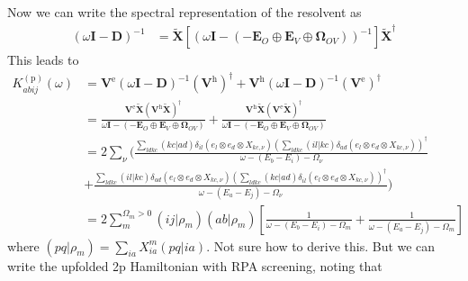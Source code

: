Now we can write the spectral representation of the resolvent as
\begin{align}
(\omega \mathbf{I} - \bm{D})^{-1} &= \bm{\tilde{X}} \left[\left(\omega \mathbf{I} - \left(-\bm{E}_O \oplus \bm{E}_V \oplus \bm{\Omega }_{OV}\right)\right)^{-1}\right] \bm{\tilde{X}}^\dagger
\end{align}
This leads to
\begin{align}
K_{abij}^{(\mathrm{p})}(\omega) &= \mathbf{V}^{\mathrm{e}}(\omega \mathbf{I} - \mathbf{D})^{-1} (\mathbf{V}^{\mathrm{h}})^{\dagger} + \mathbf{V}^{\mathrm{h}}(\omega \mathbf{I} - \mathbf{D})^{-1} (\mathbf{V}^{\mathrm{e}})^{\dagger} \\
&= \frac{\mathbf{V}^{\mathrm{e}} \bm{\tilde{X}}  (\bm{V}^{\mathrm{h}}\bm{\tilde{X}})^{\dagger}}{\omega \mathbf{I} - \left(-\bm{E}_O \oplus \bm{E}_V \oplus \bm{\Omega }_{OV}\right)} + \frac{\bm{V}^{\mathrm{h}} \bm{\tilde{X}}  (\bm{V}^{\mathrm{e}}\bm{\tilde{X}})^{\dagger}}{\omega \mathbf{I} - \left(-\bm{E}_O \oplus \bm{E}_V \oplus \bm{\Omega }_{OV}\right)} \\
&= 2\sum_{\nu}(\frac{\sum_{ldkc}(kc|ad) \delta_{il} \left( e_l \otimes e_d \otimes X_{kc,\nu} \right) (\sum_{ldkc} (il|kc) \delta_{ad} \left( e_l \otimes e_d \otimes X_{kc,\nu} \right))^{\dagger}}{\omega - (E_b - E_i) - \Omega_{\nu}} \\
&+ \frac{\sum_{ldkc}(il|kc) \delta_{ad} \left( e_l \otimes e_d \otimes X_{kc,\nu} \right) (\sum_{ldkc} (kc|ad) \delta_{il} \left( e_l \otimes e_d \otimes X_{kc,\nu} \right))^{\dagger}}{\omega - (E_a - E_j) - \Omega_{\nu}} )\\
&= 2 \sum_m^{\Omega_m>0}\left(i j| \rho_m\right)\left(a b|\rho_m\right)\left[\frac{1}{\omega-\left(E_b-E_i\right)-\Omega_m}+\frac{1}{\omega-\left(E_a-E_j\right)-\Omega_m}\right]
\end{align}
where $\left(p q | \rho_m\right)=\sum_{i a} X_{i a}^m(p q | i a)$.
Not sure how to derive this. But we can write the upfolded 2p Hamiltonian with RPA screening, noting that
